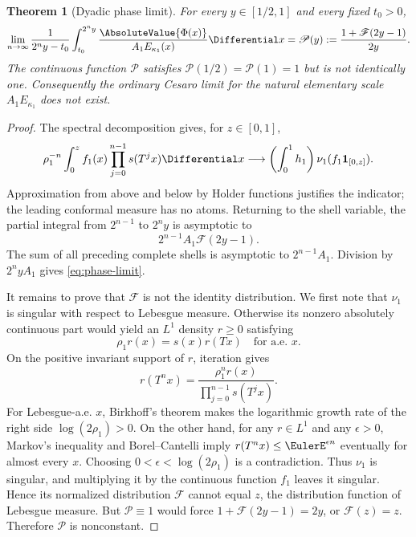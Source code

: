 \documentclass[11pt,oneside]{article}
\newtheorem{theorem}{Theorem}[section]
\theoremstyle{definition}
\theoremstyle{remark}
\newcommand{\Phiup}{\Phi}
\begin{document}
\begin{theorem}[Dyadic phase limit]
\label{thm:phase-limit}
For every $y\in[1/2,1]$ and every fixed $t_0>0$,
\begin{equation}
 \lim_{n\to\infty}
 \frac1{2^ny-t_0}\int_{t_0}^{2^ny}
 \frac{\AbsoluteValue{\Phiup(x)}}{A_1E_{\kappa_1}(x)}\Differential x
 =\mathscr P(y):=\frac{1+\mathscr F(2y-1)}{2y}.
 \label{eq:phase-limit}
\end{equation}
The continuous function $\mathscr P$ satisfies
$\mathscr P(1/2)=\mathscr P(1)=1$ but is not identically one.  Consequently the ordinary
Cesaro limit for the natural elementary scale $A_1E_{\kappa_1}$ does not exist.
\end{theorem}

\begin{proof}
The spectral decomposition gives, for $z\in[0,1]$,
\[
 \rho_1^{-n}\int_0^z f_1(x)
 \prod_{j=0}^{n-1}s(T^jx)\Differential x
 \longrightarrow
 \left(\int_0^1h_1\right)\nu_1(f_1\mathbf1_{[0,z]}).
\]
Approximation from above and below by Holder functions justifies the indicator; the
leading conformal measure has no atoms.  Returning to the shell variable, the partial
integral from $2^{n-1}$ to $2^ny$ is asymptotic to
\[
 2^{n-1}A_1\mathscr F(2y-1).
\]
The sum of all preceding complete shells is asymptotic to $2^{n-1}A_1$.  Division by
$2^nyA_1$ gives \eqref{eq:phase-limit}.

It remains to prove that $\mathscr F$ is not the identity distribution.  We first note that
$\nu_1$ is singular with respect to Lebesgue measure.  Otherwise its nonzero absolutely
continuous part would yield an $L^1$ density $r\ge0$ satisfying
\begin{equation}
 \rho_1r(x)=s(x)r(Tx)
 \quad\text{for a.e. }x.
 \label{eq:conformal-density}
\end{equation}
On the positive invariant support of $r$, iteration gives
\[
 r(T^nx)=\frac{\rho_1^nr(x)}{\prod_{j=0}^{n-1}s(T^jx)}.
\]
For Lebesgue-a.e. $x$, Birkhoff's theorem makes the logarithmic growth rate of the right
side $\log(2\rho_1)>0$.  On the other hand, for any $r\in L^1$ and any $\epsilon>0$,
Markov's inequality and Borel--Cantelli imply
$r(T^nx)\le\EulerE^{\epsilon n}$ eventually for almost every $x$.  Choosing
$0<\epsilon<\log(2\rho_1)$ is a contradiction.  Thus $\nu_1$ is singular, and multiplying
it by the continuous function $f_1$ leaves it singular.  Hence its normalized distribution
$\mathscr F$ cannot equal $z$, the distribution function of Lebesgue measure.  But
$\mathscr P\equiv1$ would force
$1+\mathscr F(2y-1)=2y$, or $\mathscr F(z)=z$.  Therefore $\mathscr P$ is nonconstant.
\end{proof}
\end{document}
